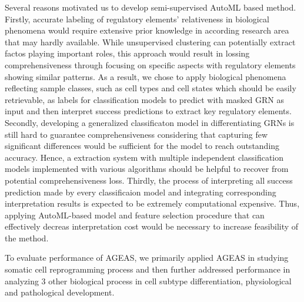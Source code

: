 \documentclass[fleqn,10pt]{wlscirep}
\begin{document}
  Several reasons motivated us to develop semi-supervised AutoML based method.
  Firstly, accurate labeling of regulatory elements' relativeness in biological phenomena would require extensive prior knowledge in according research area that may hardly available.
  While unsupervised clustering can potentially extract factos playing important roles, this approach would result in lossing comprehensiveness through focusing on specific aspects with regulatory elements showing similar patterns.
  As a result, we chose to apply biological phenomena reflecting sample classes, such as cell types and cell states which should be easily retrievable, as labels for classification models to predict with masked GRN as input and then interpret success predictions to extract key regulatory elements.
  Secondly, developing a generalized classificaton model in differentiating GRNs is still hard to guarantee comprehensiveness considering that capturing few significant differences would be sufficient for the model to reach outstanding accuracy.
  Hence, a extraction system with multiple independent classification models implemented with various algorithms should be helpful to recover from potential comprehensiveness loss.
  Thirdly, the process of interpreting all success prediction made by every classificaion model and integrating corresponding interpretation results is expected to be extremely computational expensive.
  Thus, applying AutoML-based model and feature selection procedure that can effectively decreas interpretation cost would be necessary to increase feasibility of the method.

  To evaluate performance of AGEAS, we primarily applied AGEAS in studying somatic cell reprogramming process and then further addressed performance in analyzing 3 other biological process in cell subtype differentiation, physiological and pathological development.
\end{document}
